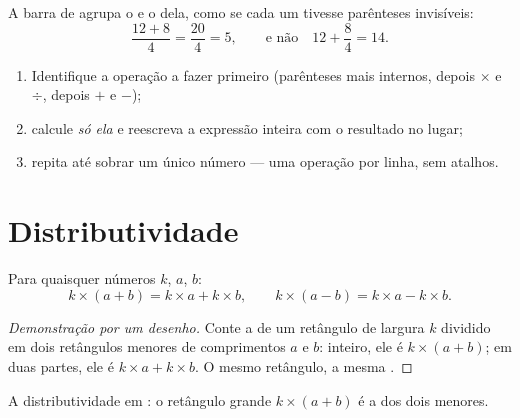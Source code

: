 \begin{remark}
A barra de  agrupa o  e o  dela, como se cada
um tivesse parênteses invisíveis:
\[
\frac{12 + 8}{4} = \frac{20}{4} = 5,
\qquad\text{e não}\quad 12 + \frac{8}{4} = 14 .
\]
\end{remark}

\begin{method}\label{met:g7:priorities:safe}
\begin{enumerate}
  \item Identifique a operação a fazer primeiro (parênteses mais
        internos, depois $\times$ e $\div$, depois $+$ e $-$);
  \item calcule \emph{só ela} e reescreva a expressão inteira com o
        resultado no lugar;
  \item repita até sobrar um único número --- uma operação por linha,
        sem atalhos.
\end{enumerate}
\end{method}

\section{Distributividade}

\begin{theorem}[Distributividade]\label{thm:g7:priorities:distributivity}
Para quaisquer números $k$, $a$, $b$:
\[
k \times (a + b) = k \times a + k \times b,
\qquad
k \times (a - b) = k \times a - k \times b .
\]
\end{theorem}

\begin{proof}[Demonstração por um desenho]
Conte a  de um retângulo de largura $k$ dividido em dois retângulos
menores de comprimentos $a$ e $b$: inteiro, ele é $k \times (a+b)$; em
duas partes, ele é $k \times a + k \times b$. O mesmo retângulo, a
mesma .
\end{proof}

\begin{omfigure}

{\small A distributividade em : o retângulo grande
$k \times (a + b)$ é a  dos dois menores.}
\end{omfigure}

